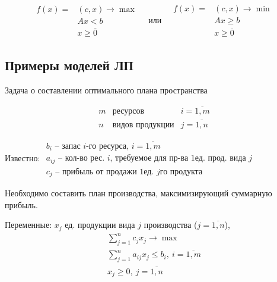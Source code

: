 \begin{note}
	\[
		\begin{array}{ll}
			f(x) = & (c,x) \rightarrow \max   \\
			       & Ax < b                   \\
			       & x \geqslant \overline{0}
		\end{array} \quad \text{или} \quad \begin{array}{ll}
			f(x) = & (c,x) \rightarrow \min   \\
			       & Ax \geqslant b           \\
			       & x \geqslant \overline{0}
		\end{array}
	\]
\end{note}

\subsection*{Примеры моделей ЛП}

\begin{eg}
	Задача о составлении оптимального плана пространства

	\[
		\begin{array}{cll}
			m & \text{ресурсов}        & i = \overline{1,m} \\
			n & \text{видов продукции} & j = \overline{1,n}
		\end{array}
	\]

	Известно: $\begin{array}{l}
			b_i \text{ -- запас }i \text{-го ресурса, }i = \overline{1,m}                  \\
			a_{ij} \text{ -- кол-во рес. }i \text{, требуемое для пр-ва 1ед. прод. вида }j \\
			c_j \text{ -- прибыль от продажи 1ед. }j \text{го продукта}
		\end{array}$

	Необходимо составить план производства, максимизирующий суммарную прибыль.

	Переменные: $x_j$ ед. продукции вида $j$ производства ($j = \overline{1,n} $),
	\[
		\begin{array}{l}
			\sum_{j=1}^{n} c_jx_j \rightarrow \max                        \\
			\sum_{j=1}^{n} a_{ij} x_j \leqslant b_i, \ i = \overline{1,m} \\
			x_j \geqslant 0, \ j = \overline{1,n}
		\end{array}
	\]
\end{eg}

